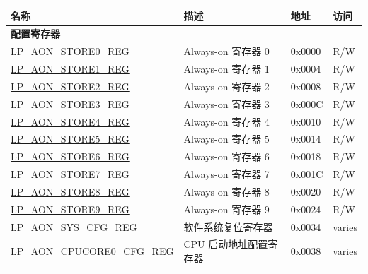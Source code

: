 \begin{longtable}{ | l | p{6.5cm} | p{1.3cm} | p{1cm} | }
\hline\rowcolor{lightgray}
\textbf{名称} & \textbf{描述} &  \textbf{地址} & \textbf{访问} \\ \hline
\endhead
\multicolumn{4}{|l|}{\textbf{配置寄存器}} \\ \hline
\hyperref[regdesc:LPAONSTORENREG]{LP\_AON\_STORE0\_REG} & Always-on 寄存器 0 & 0x0000 & R/W \\ \hline
\hyperref[regdesc:LPAONSTORENREG]{LP\_AON\_STORE1\_REG} & Always-on 寄存器 1 & 0x0004 & R/W \\ \hline
\hyperref[regdesc:LPAONSTORENREG]{LP\_AON\_STORE2\_REG} & Always-on 寄存器 2 & 0x0008 & R/W \\ \hline
\hyperref[regdesc:LPAONSTORENREG]{LP\_AON\_STORE3\_REG} & Always-on 寄存器 3 & 0x000C & R/W \\ \hline
\hyperref[regdesc:LPAONSTORENREG]{LP\_AON\_STORE4\_REG} & Always-on 寄存器 4 & 0x0010 & R/W \\ \hline
\hyperref[regdesc:LPAONSTORENREG]{LP\_AON\_STORE5\_REG} & Always-on 寄存器 5 & 0x0014 & R/W \\ \hline
\hyperref[regdesc:LPAONSTORENREG]{LP\_AON\_STORE6\_REG} & Always-on 寄存器 6 & 0x0018 & R/W \\ \hline
\hyperref[regdesc:LPAONSTORENREG]{LP\_AON\_STORE7\_REG} & Always-on 寄存器 7 & 0x001C & R/W \\ \hline
\hyperref[regdesc:LPAONSTORENREG]{LP\_AON\_STORE8\_REG} & Always-on 寄存器 8 & 0x0020 & R/W \\ \hline
\hyperref[regdesc:LPAONSTORENREG]{LP\_AON\_STORE9\_REG} & Always-on 寄存器 9 & 0x0024 & R/W \\ \hline
\hyperref[regdesc:LPAONSYSCFGREG]{LP\_AON\_SYS\_CFG\_REG} & 软件系统复位寄存器 & 0x0034 & varies \\ \hline
\hyperref[regdesc:LPAONCPUCORE0CFGREG]{LP\_AON\_CPUCORE0\_CFG\_REG} & CPU 启动地址配置寄存器 & 0x0038 & varies \\ \hline
\end{longtable}
